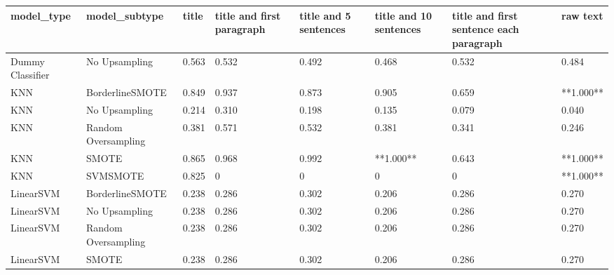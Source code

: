 \begin{tabular}{llllllll}
\toprule
                  model\_type &       model\_subtype & title & title and first paragraph & title and 5 sentences & title and 10 sentences & title and first sentence each paragraph &  raw text \\
\midrule
            Dummy Classifier &       No Upsampling & 0.563 &                     0.532 &                 0.492 &                  0.468 &                                   0.532 &     0.484 \\
                         KNN &     BorderlineSMOTE & 0.849 &                     0.937 &                 0.873 &                  0.905 &                                   0.659 & **1.000** \\
                         KNN &       No Upsampling & 0.214 &                     0.310 &                 0.198 &                  0.135 &                                   0.079 &     0.040 \\
                         KNN & Random Oversampling & 0.381 &                     0.571 &                 0.532 &                  0.381 &                                   0.341 &     0.246 \\
                         KNN &               SMOTE & 0.865 &                     0.968 &                 0.992 &              **1.000** &                                   0.643 & **1.000** \\
                         KNN &            SVMSMOTE & 0.825 &                         0 &                     0 &                      0 &                                       0 & **1.000** \\
                   LinearSVM &     BorderlineSMOTE & 0.238 &                     0.286 &                 0.302 &                  0.206 &                                   0.286 &     0.270 \\
                   LinearSVM &       No Upsampling & 0.238 &                     0.286 &                 0.302 &                  0.206 &                                   0.286 &     0.270 \\
                   LinearSVM & Random Oversampling & 0.238 &                     0.286 &                 0.302 &                  0.206 &                                   0.286 &     0.270 \\
                   LinearSVM &               SMOTE & 0.238 &                     0.286 &                 0.302 &                  0.206 &                                   0.286 &     0.270 \\

\end{tabular}
